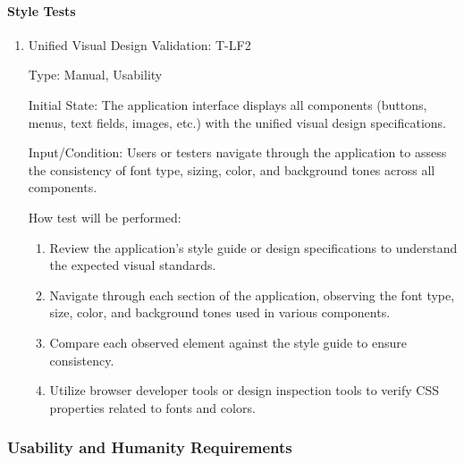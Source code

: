 \documentclass[12pt, titlepage]{article}
\begin{document}
\begin{enumerate}
\end{enumerate}


\paragraph{Style Tests}
\begin{enumerate}
\item{Unified Visual Design Validation: T-LF2\\}

Type: Manual, Usability

Initial State: The application interface displays all components (buttons, menus, text fields, images, etc.) with the unified visual design specifications.

Input/Condition: Users or testers navigate through the application to assess the consistency of font type, sizing, color, and background tones across all components.

How test will be performed:
\begin{enumerate}
    \item Review the application's style guide or design specifications to understand the expected visual standards.
    \item Navigate through each section of the application, observing the font type, size, color, and background tones used in various components.
    \item Compare each observed element against the style guide to ensure consistency.
    \item Utilize browser developer tools or design inspection tools to verify CSS properties related to fonts and colors.
\end{enumerate}

\end{enumerate}


\subsubsection{Usability and Humanity Requirements}
\end{document}
